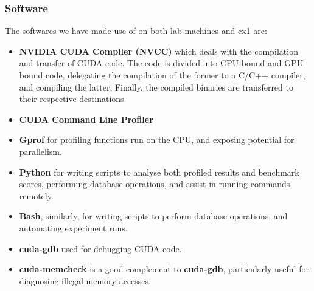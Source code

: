 \subsubsection*{Software}
The softwares we have made use of on both lab machines and cx1 are:
\begin{itemize}
  \item \textbf{NVIDIA CUDA Compiler (NVCC)} which deals with the compilation and transfer of CUDA code. The code is divided into CPU-bound and GPU-bound code, delegating the compilation of the former to a C/C++ compiler, and compiling the latter. Finally, the compiled binaries are transferred to their respective destinations.
  \item \textbf{CUDA Command Line Profiler}
  \item \textbf{Gprof} for profiling functions run on the CPU, and exposing potential for parallelism.
  \item \textbf{Python} for writing scripts to analyse both profiled results and benchmark scores, performing database operations, and assist in running commands remotely.
  \item \textbf{Bash}, similarly, for writing scripts to perform database operations, and automating experiment runs.
  \item \textbf{cuda-gdb} used for debugging CUDA code.
  \item \textbf{cuda-memcheck} is a good complement to \textbf{cuda-gdb}, particularly useful for diagnosing illegal memory accesses.
\end{itemize}